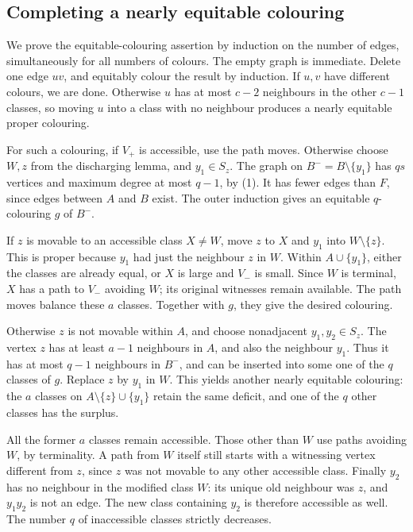 \subsection*{Completing a nearly equitable colouring}
We prove the equitable-colouring assertion by induction on the number of edges, simultaneously for all numbers of colours. The empty graph is immediate. Delete one edge \(uv\), and equitably colour the result by induction. If \(u,v\) have different colours, we are done. Otherwise \(u\) has at most \(c-2\) neighbours in the other \(c-1\) classes, so moving \(u\) into a class with no neighbour produces a nearly equitable proper colouring.

For such a colouring, if \(V_+\) is accessible, use the path moves. Otherwise choose \(W,z\) from the discharging lemma, and \(y_1\in S_z\).
The graph on \(B^-=B\setminus\{y_1\}\) has \(qs\) vertices and maximum degree at most \(q-1\), by (1). It has fewer edges than \(F\), since edges between \(A\) and \(B\) exist. The outer induction gives an equitable \(q\)-colouring \(g\) of \(B^-\).

If \(z\) is movable to an accessible class \(X\ne W\), move \(z\) to \(X\) and \(y_1\) into \(W\setminus\{z\}\). This is proper because \(y_1\) had just the neighbour \(z\) in \(W\). Within \(A\cup\{y_1\}\), either the classes are already equal, or \(X\) is large and \(V_-\) is small.
Since \(W\) is terminal, \(X\) has a path to \(V_-\) avoiding \(W\); its original witnesses remain available. The path moves balance these \(a\) classes. Together with \(g\), they give the desired colouring.

Otherwise \(z\) is not movable within \(A\), and choose nonadjacent \(y_1,y_2\in S_z\). The vertex \(z\) has at least \(a-1\) neighbours in \(A\), and also the neighbour \(y_1\). Thus it has at most \(q-1\) neighbours in \(B^-\), and can be inserted into some one of the \(q\) classes of \(g\).
Replace \(z\) by \(y_1\) in \(W\). This yields another nearly equitable colouring: the \(a\) classes on \(A\setminus\{z\}\cup\{y_1\}\) retain the same deficit, and one of the \(q\) other classes has the surplus.

All the former \(a\) classes remain accessible. Those other than \(W\) use paths avoiding \(W\), by terminality. A path from \(W\) itself still starts with a witnessing vertex different from \(z\), since \(z\) was not movable to any other accessible class. Finally \(y_2\) has no neighbour in the modified class \(W\): its unique old neighbour was \(z\), and \(y_1y_2\) is not an edge. The new class containing \(y_2\) is therefore accessible as well.
The number \(q\) of inaccessible classes strictly decreases.

